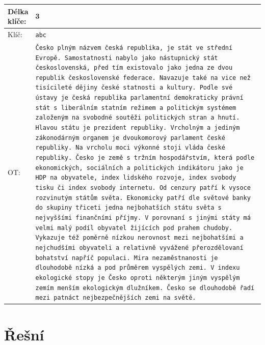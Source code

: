 \documentclass{article}
\begin{document}
\begin{longtable}{|p{0.1\linewidth}|p{0.9\linewidth}|}
    Délka klíče: & 3 \\ \hline
    Klíč: & \texttt{abc} \\ \hline
    OT: & \texttt{Česko plným názvem česká republika, je stát ve střední Evropě. Samostatnosti nabylo jako nástupnický stát československá, před tím existovalo jako jedna ze dvou republik československé federace. Navazuje také na vice než tisícileté dějiny české statnosti a kultury. Podle své ústavy je česká republika parlamentní demokraticky právní stát s liberálním statním režimem a politickým systémem založeným na svobodné soutěži politických stran a hnutí. Hlavou státu je prezident republiky. Vrcholným a jediným zákonodárným organem je dvoukomorový parlament české republiky. Na vrcholu moci výkonné stoji vláda české republiky. Česko je země s tržním hospodářstvím, která podle ekonomických, sociálních a politických indikátoru jako je HDP na obyvatele, index lidského rozvoje, index svobody tisku či index svobody internetu. Od cenzury patří k vysoce rozvinutým státům světa. Ekonomicky patří dle světové banky do skupiny třiceti jedna nejbohatších státu světa s nejvyššími finančními příjmy. V porovnaní s jinými státy má velmi malý podíl obyvatel žijících pod prahem chudoby. Vykazuje též poměrně nízkou nerovnost mezi nejbohatšími a nejchudšími obyvateli a relativně vyvážené přerozdělovaní bohatství napříč populaci. Mira nezaměstnanosti je dlouhodobě nízká a pod průměrem vyspělých zemi. V indexu ekologické stopy je Česko oproti některým jiným vyspělým zemím menším ekologickým dlužníkem. Česko se dlouhodobě řadí mezi patnáct nejbezpečnějších zemi na světě.} \\\hline
\end{longtable}
\raggedright
\newpage

\section{Řešní}
\end{document}
